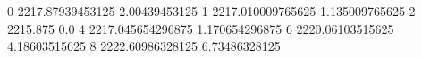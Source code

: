0 2217.87939453125 2.00439453125
1 2217.010009765625 1.135009765625
2 2215.875 0.0
4 2217.045654296875 1.170654296875
6 2220.06103515625 4.18603515625
8 2222.60986328125 6.73486328125
